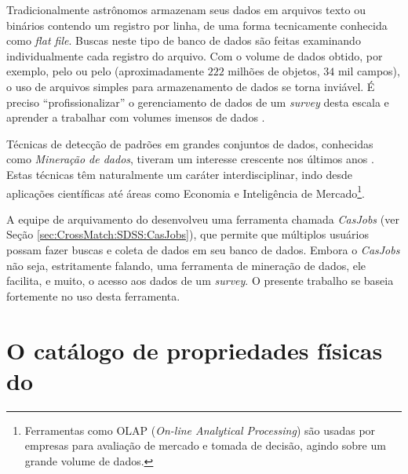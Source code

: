 Tradicionalmente astrônomos armazenam seus dados em arquivos texto ou binários
contendo um registro por linha, de uma forma tecnicamente conhecida como {\em
flat file}. Buscas neste tipo de banco de dados são feitas examinando
individualmente cada registro do arquivo. Com o volume de dados obtido, por
exemplo, pelo \SDSS ou pelo \galex (aproximadamente $222$ milhões de objetos,
$34$ mil campos), o uso de arquivos simples para armazenamento de dados se torna
inviável. É preciso ``profissionalizar'' o gerenciamento de dados de um {\em
survey} desta escala e aprender a trabalhar com volumes imensos de dados
\citep{Bell2006}.

Técnicas de detecção de padrões em grandes conjuntos de dados, conhecidas como
{\em Mineração de dados}, tiveram um interesse crescente nos últimos anos
\citep{SIGKDD2011}. Estas técnicas têm naturalmente um caráter interdisciplinar,
indo desde aplicações científicas até áreas como Economia \citep{Spanos2000} e
Inteligência de Mercado\footnote{Ferramentas como OLAP ({\em On-line Analytical
Processing}) são usadas por empresas para avaliação de mercado e tomada de
decisão, agindo sobre um grande volume de dados.}.

A equipe de arquivamento do \SDSS desenvolveu uma ferramenta chamada {\em
CasJobs} (ver Seção \ref{sec:CrossMatch:SDSS:CasJobs}), que permite que
múltiplos usuários possam fazer buscas e coleta de dados em seu banco de dados.
Embora o {\em CasJobs} não seja, estritamente falando, uma ferramenta de
mineração de dados, ele facilita, e muito, o acesso aos dados de um {\em
survey}. O presente trabalho se baseia fortemente no uso desta ferramenta.



\section{O catálogo de propriedades físicas do \STARLIGHT}
\label{sec:Intro:Starlight}

